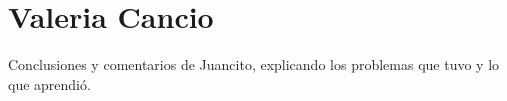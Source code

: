 \section{Valeria Cancio}
Conclusiones y comentarios de Juancito, explicando los problemas que tuvo y lo que aprendió.